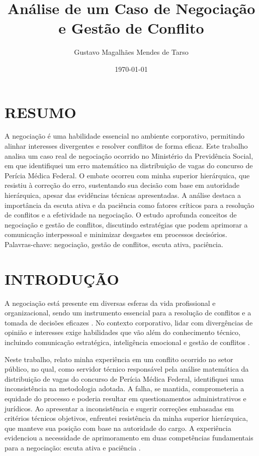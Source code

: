 \documentclass[article,12pt,oneside,a4paper]{article}
\author{Gustavo Magalhães Mendes de Tarso}
\date{\today}
\title{Análise de um Caso de Negociação e Gestão de Conflito}
\begin{document}
\maketitle
\section{RESUMO}
\label{sec:orgcdce6e7}

A negociação é uma habilidade essencial no ambiente corporativo, permitindo alinhar interesses divergentes e resolver conflitos de forma eficaz. Este trabalho analisa um caso real de negociação ocorrido no Ministério da Previdência Social, em que identifiquei um erro matemático na distribuição de vagas do concurso de Perícia Médica Federal. O embate ocorreu com minha superior hierárquica, que resistiu à correção do erro, sustentando sua decisão com base em autoridade hierárquica, apesar das evidências técnicas apresentadas. A análise destaca a importância da escuta ativa e da paciência como fatores críticos para a resolução de conflitos e a efetividade na negociação. O estudo aprofunda conceitos de negociação e gestão de conflitos, discutindo estratégias que podem aprimorar a comunicação interpessoal e minimizar desgastes em processos decisórios. \\

Palavras-chave: negociação, gestão de conflitos, escuta ativa, paciência.
\section{INTRODUÇÃO}
\label{sec:orgd5a2473}

A negociação está presente em diversas esferas da vida profissional e organizacional, sendo um instrumento essencial para a resolução de conflitos e a tomada de decisões eficazes \cite{fisher1991getting}. No contexto corporativo, lidar com divergências de opinião e interesses exige habilidades que vão além do conhecimento técnico, incluindo comunicação estratégica, inteligência emocional e gestão de conflitos \cite{goleman1998trabalhando}.

Neste trabalho, relato minha experiência em um conflito ocorrido no setor público, no qual, como servidor técnico responsável pela análise matemática da distribuição de vagas do concurso de Perícia Médica Federal, identifiquei uma inconsistência na metodologia adotada. A falha, se mantida, comprometeria a equidade do processo e poderia resultar em questionamentos administrativos e jurídicos. Ao apresentar a inconsistência e sugerir correções embasadas em critérios técnicos objetivos, enfrentei resistência da minha superior hierárquica, que manteve sua posição com base na autoridade do cargo. A experiência evidenciou a necessidade de aprimoramento em duas competências fundamentais para a negociação: escuta ativa e paciência \cite{ury1993como}.
\end{document}
